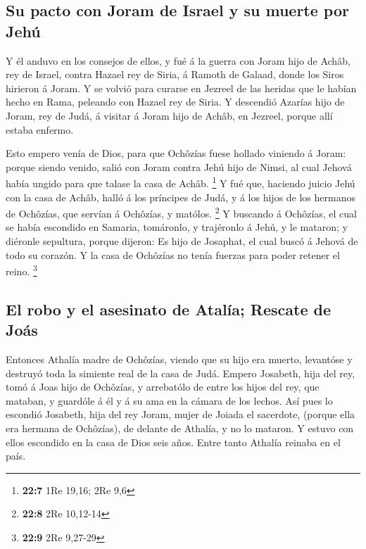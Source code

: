 \hypertarget{su-pacto-con-joram-de-israel-y-su-muerte-por-jehuxfa}{%
\subsection{Su pacto con Joram de Israel y su muerte por
Jehú}\label{su-pacto-con-joram-de-israel-y-su-muerte-por-jehuxfa}}

 Y él anduvo en los consejos de ellos, y fué á la guerra
con Joram hijo de Achâb, rey de Israel, contra Hazael rey de Siria, á
Ramoth de Galaad, donde los Siros hirieron á Joram.  Y se
volvió para curarse en Jezreel de las heridas que le habían hecho en
Rama, peleando con Hazael rey de Siria. Y descendió Azarías hijo de
Joram, rey de Judá, á visitar á Joram hijo de Achâb, en Jezreel, porque
allí estaba enfermo.

 Esto empero venía de Dios, para que Ochôzías fuese
hollado viniendo á Joram: porque siendo venido, salió con Joram contra
Jehú hijo de Nimsi, al cual Jehová había ungido para que talase la casa
de Achâb. \footnote{\textbf{22:7} 1Re 19,16; 2Re 9,6}  Y
fué que, haciendo juicio Jehú con la casa de Achâb, halló á los
príncipes de Judá, y á los hijos de los hermanos de Ochôzías, que
servían á Ochôzías, y matólos. \footnote{\textbf{22:8} 2Re 10,12-14}
 Y buscando á Ochôzías, el cual se había escondido en
Samaria, tomáronlo, y trajéronlo á Jehú, y le mataron; y diéronle
sepultura, porque dijeron: Es hijo de Josaphat, el cual buscó á Jehová
de todo su corazón. Y la casa de Ochôzías no tenía fuerzas para poder
retener el reino. \footnote{\textbf{22:9} 2Re 9,27-29}

\hypertarget{el-robo-y-el-asesinato-de-ataluxeda-rescate-de-jouxe1s}{%
\subsection{El robo y el asesinato de Atalía; Rescate de
Joás}\label{el-robo-y-el-asesinato-de-ataluxeda-rescate-de-jouxe1s}}

 Entonces Athalía madre de Ochôzías, viendo que su hijo
era muerto, levantóse y destruyó toda la simiente real de la casa de
Judá.  Empero Josabeth, hija del rey, tomó á Joas hijo de
Ochôzías, y arrebatólo de entre los hijos del rey, que mataban, y
guardóle á él y á su ama en la cámara de los lechos. Así pues lo
escondió Josabeth, hija del rey Joram, mujer de Joiada el sacerdote,
(porque ella era hermana de Ochôzías), de delante de Athalía, y no lo
mataron.  Y estuvo con ellos escondido en la casa de Dios
seis años. Entre tanto Athalía reinaba en el país.

